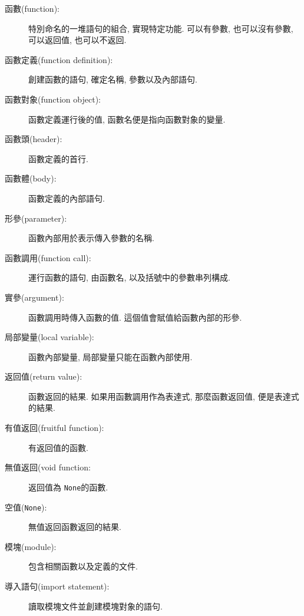 \documentclass[10pt]{book}
\begin{document}
\begin{description}

\item[函數(function):] 特別命名的一堆語句的組合, 實現特定功能. 可以有參數, 
也可以沒有參數, 可以返回值, 也可以不返回. 

\item[函數定義(function definition):]  創建函數的語句, 確定名稱, 參數以及內部語句. 

\item[函數對象(function object):]  函數定義運行後的值, 函數名便是指向函數對象的變量. 

\item[函數頭(header):] 函數定義的首行.

\item[函數體(body):] 函數定義的內部語句.

\item[形參(parameter):] 函數內部用於表示傳入參數的名稱. 

\item[函數調用(function call):] 運行函數的語句, 由函數名, 以及括號中的參數串列構成. 

\item[實參(argument):]  函數調用時傳入函數的值. 這個值會賦值給函數內部的形參. 

\item[局部變量(local variable):]  函數內部變量, 局部變量只能在函數內部使用. 

\item[返回值(return value):]  函數返回的結果. 如果用函數調用作為表達式, 那麼函數返回值, 便是表達式的結果. 

\item[有值返回(fruitful function):] 有返回值的函數. 

\item[無值返回(void function:] 返回值為 {\tt None}的函數. 

\item[空值({\tt None}):] 無值返回函數返回的結果. 

\item[模塊(module):] 包含相關函數以及定義的文件. 

\item[導入語句(import statement):] 讀取模塊文件並創建模塊對象的語句. 


\end{description}
\end{document}
